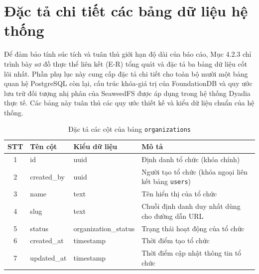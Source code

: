 \documentclass[../DoAn.tex]{subfiles}
\begin{document}
\section{Đặc tả chi tiết các bảng dữ liệu hệ thống}
\label{chapter:db_schema}

Để đảm bảo tính súc tích và tuân thủ giới hạn độ dài của báo cáo, Mục 4.2.3 chỉ trình bày sơ đồ thực thể liên kết (E-R) tổng quát và đặc tả ba bảng dữ liệu cốt lõi nhất. Phần phụ lục này cung cấp đặc tả chi tiết cho toàn bộ mười một bảng quan hệ PostgreSQL còn lại, cấu trúc khóa-giá trị của FoundationDB và quy ước lưu trữ đối tượng nhị phân của SeaweedFS được áp dụng trong hệ thống Dyadia thực tế. Các bảng này tuân thủ các quy ước thiết kế và kiểu dữ liệu chuẩn của hệ thống.

\begin{table}[H]
\centering
\small
\renewcommand{\arraystretch}{1.3}
\begin{tabular}{|c|l|l|p{6.2cm}|}
\hline
\textbf{STT} & \textbf{Tên cột} & \textbf{Kiểu dữ liệu} & \textbf{Mô tả} \\ \hline
1 & id & uuid & Định danh tổ chức (khóa chính) \\ \hline
2 & created\_by & uuid & Người tạo tổ chức (khóa ngoại liên kết bảng \texttt{users}) \\ \hline
3 & name & text & Tên hiển thị của tổ chức \\ \hline
4 & slug & text & Chuỗi định danh duy nhất dùng cho đường dẫn URL \\ \hline
5 & status & organization\_status & Trạng thái hoạt động của tổ chức \\ \hline
6 & created\_at & timestamp & Thời điểm tạo tổ chức \\ \hline
7 & updated\_at & timestamp & Thời điểm cập nhật thông tin tổ chức \\ \hline
\end{tabular}
\caption{Đặc tả các cột của bảng \texttt{organizations}}
\label{tbl:organizations}
\end{table}
\end{document}
